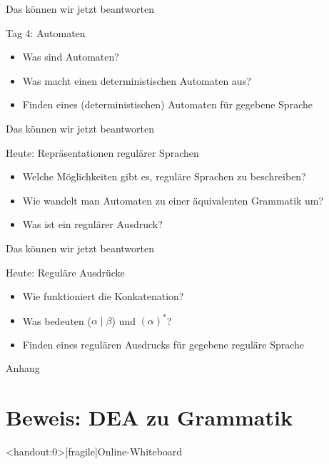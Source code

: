 \begin{frame}[fragile]{Das können wir jetzt beantworten}
    \begin{alertblock}{Tag 4: Automaten}
        \begin{itemize}
            \item Was sind Automaten?
            \item Was macht einen deterministischen Automaten aus?
            \item Finden eines (deterministischen) Automaten für gegebene Sprache
        \end{itemize}
    \end{alertblock}
\end{frame}



\begin{frame}[fragile]{Das können wir jetzt beantworten}
    \begin{alertblock}{Heute: Repräsentationen regulärer Sprachen}
        \begin{itemize}
            \item Welche Möglichkeiten gibt es, reguläre Sprachen zu beschreiben?
            \item Wie wandelt man Automaten zu einer äquivalenten Grammatik um?
            \item Was ist ein regulärer Ausdruck?
        \end{itemize}
    \end{alertblock}
\end{frame}

\begin{frame}[fragile]{Das können wir jetzt beantworten}
    \begin{alertblock}{Heute: Reguläre Ausdrücke}
        \begin{itemize}
            \item Wie funktioniert die Konkatenation?
            \item Was bedeuten ($\alpha \mid \beta$) und $(\alpha)^*$?
            \item Finden eines regulären Ausdrucks für gegebene reguläre Sprache
        \end{itemize}
    \end{alertblock}
\end{frame}








\appendix
\begin{frame}[standout]
    Anhang
\end{frame}

\section{Beweis: DEA zu Grammatik}


\begin{frame}<handout:0>[fragile]{Online-Whiteboard}
    \phantom{text}
\end{frame}



